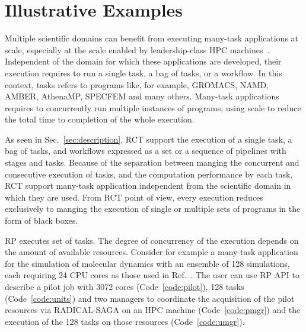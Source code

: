 \documentclass[preprint,12pt, a4paper]{elsarticle}
\begin{document}
\section{Illustrative Examples}\label{sec:examples}




Multiple scientific domains can benefit from executing many-task applications
at scale, especially at the scale enabled by leadership-class HPC
machines~\cite{raicu2008many,iosup2011performance}. Independent of the domain
for which these applications are developed, their execution requires to run a
single task, a bag of tasks, or a workflow. In this context, tasks refers to
programs like, for example, GROMACS, NAMD, AMBER, AthenaMP, SPECFEM and many
others. Many-task applications requires to concurrently run multiple
instances of programs, using scale to reduce the total time to completion of
the whole execution.

As seen in Sec.~\ref{sec:description}, RCT support the execution of a single
task, a bag of tasks, and workflows expressed as a set or a sequence of
pipelines with stages and tasks. Because of the separation between manging
the concurrent and consecutive execution of tasks, and the computation
performance by each task, RCT support many-task application independent from
the scientific domain in which they are used. From RCT point of view, every
execution reduces exclusively to manging the execution of single or multiple
sets of programs in the form of black boxes.

RP executes set of tasks. The degree of concurrency of the execution depends
on the amount of available resources. Consider for example a many-task
application for the simulation of molecular dynamics with an ensemble of 128
simulations, each requiring 24 CPU cores as those used in
Ref.~\cite{balasubramanian2016extasy}. The user can use RP API to describe a
pilot job with 3072 cores (Code~\ref{code:pilot}), 128 tasks
(Code~\ref{code:units}) and two managers to coordinate the acquisition of the
pilot resources via RADICAL-SAGA on an HPC machine (Code~\ref{code:pmgr}) and
the execution of the 128 tasks on those resources (Code~\ref{code:umgr}).
\end{document}
